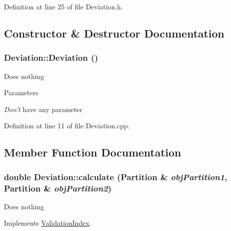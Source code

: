 Definition at line 25 of file Deviation.h.

\subsection{Constructor \& Destructor Documentation}
\hypertarget{classDeviation_ac6a194e1389f1b31ab8b80b80cb6e74e}{
\subsubsection[{Deviation}]{\setlength{\rightskip}{0pt plus 5cm}Deviation::Deviation ()}}
\label{classDeviation_ac6a194e1389f1b31ab8b80b80cb6e74e}
Does nothing 
\begin{DoxyParams}{Parameters}
\item[{\em Don't}]have any parameter \end{DoxyParams}


Definition at line 11 of file Deviation.cpp.

\subsection{Member Function Documentation}
\hypertarget{classDeviation_af722cf601ea21cc689a77c1de470bcb5}{
\subsubsection[{calculate}]{\setlength{\rightskip}{0pt plus 5cm}double Deviation::calculate ({\bf Partition} \& {\em objPartition1}, \/  {\bf Partition} \& {\em objPartition2})}}
\label{classDeviation_af722cf601ea21cc689a77c1de470bcb5}
Does nothing 

Implements \hyperlink{classValidationIndex_a8b688d8d53fbdacec393730fe2bab614}{ValidationIndex}.


